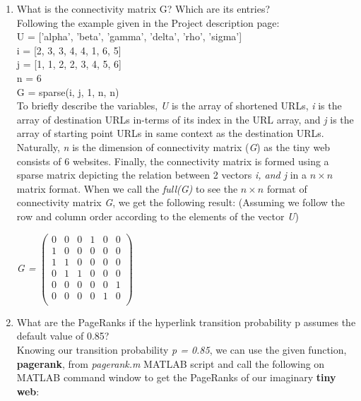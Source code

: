 \documentclass[unicode,11pt,a4paper,oneside,numbers=endperiod,openany]{scrartcl}
\begin{document}
\begin{enumerate}
 \item {What is the connectivity matrix G? Which are its entries?} \\
 
 Following the example given in the Project description page:\\
 
 {U = ['alpha', 'beta', 'gamma', 'delta', 'rho', 'sigma']}\\
 {i = [2, 3, 3, 4, 4, 1, 6, 5]}\\
 {j = [1, 1, 2, 2, 3, 4, 5, 6]}\\
 {n = 6 \\ G = sparse(i, j, 1, n, n)}\\
 
 {To briefly describe the variables, \textit{U} is the array of shortened URLs, \textit{i} is the array of destination URLs in-terms of its index in the URL array, and \textit{j} is the array of starting point URLs in same context as the destination URLs. Naturally, \textit{n} is the dimension of connectivity matrix (\textit{G}) as the tiny web consists of 6 websites. Finally, the connectivity matrix is formed using a sparse matrix depicting the relation between 2 vectors \textit{i, and j} in a $n \times n$ matrix format. When we call the \textit{full(G)} to see the $n \times n$ format of connectivity matrix \textit{G}, we get the following result: (Assuming we follow the row and column order according to the elements of the vector \textit{U})}
 
\begin{center}
{ \textit{G =}
$\begin{pmatrix}
 0 & 0 & 0 & 1 & 0 & 0 \\
 1 & 0 & 0 & 0 & 0 & 0 \\
 1 & 1 & 0 & 0 & 0 & 0 \\
 0 & 1 & 1 & 0 & 0 & 0 \\
 0 & 0 & 0 & 0 & 0 & 1 \\
 0 & 0 & 0 & 0 & 1 & 0 \\
\end{pmatrix}$
}
\end{center}

\item {What are the PageRanks if the hyperlink transition probability p assumes the default value of 0.85?} \\

{Knowing our transition probability \textit{p = 0.85}, we can use the given function,\textbf{ pagerank}, from \textit{pagerank.m} MATLAB script and call the following on MATLAB command window to get the PageRanks of our imaginary \textbf{tiny web}:}


\end{enumerate}
\end{document}

